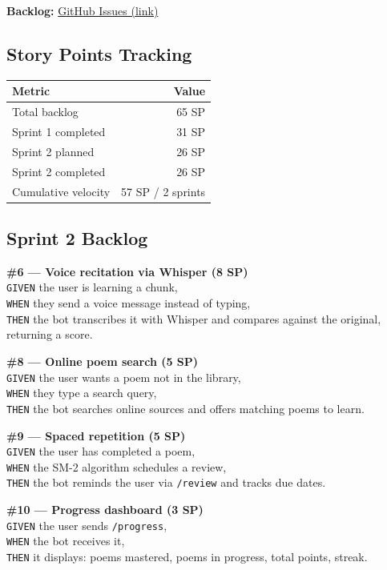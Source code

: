 \documentclass[11pt, a4paper]{article}
\begin{document}
\textbf{Backlog:} \href{https://github.com/d13-l1t3/PoetryForYou/issues}{GitHub Issues (link)}

\subsection*{Story Points Tracking}

\begin{center}
\begin{tabular}{|l|r|}
\hline
\textbf{Metric} & \textbf{Value} \\
\hline
Total backlog & 65 SP \\
\hline
Sprint 1 completed & 31 SP \\
\hline
Sprint 2 planned & 26 SP \\
\hline
Sprint 2 completed & 26 SP \\
\hline
Cumulative velocity & 57 SP / 2 sprints \\
\hline
\end{tabular}
\end{center}

\subsection*{Sprint 2 Backlog}

\textbf{\#6 --- Voice recitation via Whisper (8 SP)}\\
\texttt{GIVEN} the user is learning a chunk,\\
\texttt{WHEN} they send a voice message instead of typing,\\
\texttt{THEN} the bot transcribes it with Whisper and compares against the original, returning a score.

\textbf{\#8 --- Online poem search (5 SP)}\\
\texttt{GIVEN} the user wants a poem not in the library,\\
\texttt{WHEN} they type a search query,\\
\texttt{THEN} the bot searches online sources and offers matching poems to learn.

\textbf{\#9 --- Spaced repetition (5 SP)}\\
\texttt{GIVEN} the user has completed a poem,\\
\texttt{WHEN} the SM-2 algorithm schedules a review,\\
\texttt{THEN} the bot reminds the user via \texttt{/review} and tracks due dates.

\textbf{\#10 --- Progress dashboard (3 SP)}\\
\texttt{GIVEN} the user sends \texttt{/progress},\\
\texttt{WHEN} the bot receives it,\\
\texttt{THEN} it displays: poems mastered, poems in progress, total points, streak.
\end{document}
